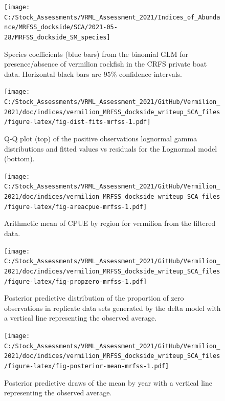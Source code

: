 \documentclass[11pt,
  english,
  a4paper,
]{article}
\begin{document}
\FloatBarrier

\FloatBarrier

\begin{figure}
\texttt{[image: C:/Stock\_Assessments/VRML\_Assessment\_2021/Indices\_of\_Abundance/MRFSS\_dockside/SCA/2021-05-28/MRFSS\_dockside\_SM\_species]} \caption{Species coefficients (blue bars) from the binomial GLM for presence/absence of vermilion rockfish in the CRFS private boat data. Horizontal black bars are $95\%$ confidence intervals.}\label{fig:fig-sm-mrfss}
\end{figure}

\begin{figure}
\centering
\texttt{[image: C:/Stock\_Assessments/VRML\_Assessment\_2021/GitHub/Vermilion\_2021/doc/indices/vermilion\_MRFSS\_dockside\_writeup\_SCA\_files/figure-latex/fig-dist-fits-mrfss-1.pdf]}
\caption{\label{fig:fig-dist-fits-mrfss}Q-Q plot (top) of the positive observations lognormal gamma distributions and fitted values vs residuals for the Lognormal model (bottom).}
\end{figure}

\FloatBarrier

\begin{figure}
\centering
\texttt{[image: C:/Stock\_Assessments/VRML\_Assessment\_2021/GitHub/Vermilion\_2021/doc/indices/vermilion\_MRFSS\_dockside\_writeup\_SCA\_files/figure-latex/fig-areacpue-mrfss-1.pdf]}
\caption{\label{fig:fig-areacpue-mrfss}Arithmetic mean of CPUE by region for vermilion from the filtered data.}
\end{figure}

\begin{figure}
\centering
\texttt{[image: C:/Stock\_Assessments/VRML\_Assessment\_2021/GitHub/Vermilion\_2021/doc/indices/vermilion\_MRFSS\_dockside\_writeup\_SCA\_files/figure-latex/fig-propzero-mrfss-1.pdf]}
\caption{\label{fig:fig-propzero-mrfss}Posterior predictive distribution of the proportion of zero observations in replicate data sets generated by the delta model with a vertical line representing the observed average.}
\end{figure}

\begin{figure}
\centering
\texttt{[image: C:/Stock\_Assessments/VRML\_Assessment\_2021/GitHub/Vermilion\_2021/doc/indices/vermilion\_MRFSS\_dockside\_writeup\_SCA\_files/figure-latex/fig-posterior-mean-mrfss-1.pdf]}
\caption{\label{fig:fig-posterior-mean-mrfss}Posterior predictive draws of the mean by year with a vertical line representing the observed average.}
\end{figure}
\end{document}
